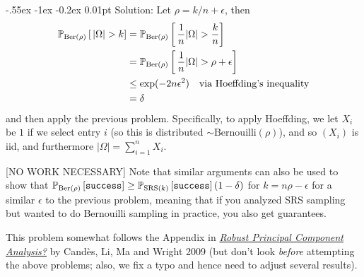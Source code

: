 \documentclass[10pt, letterpaper]{scrartcl}
\makeatletter
\newlength{\savedparindent}
\newcommand\solParagraph{\@startsection{paragraph}{4}{\z@}%
    {-.55ex \@plus -1ex \@minus -0.2ex}%
    {0.01pt}%
    {\raggedsection\normalfont\sectfont\nobreak\size@paragraph}%
}
\newenvironment{solution}{\setlength{\parindent}{\savedparindent}\solParagraph{Solution:}}{}
\makeatother
\begin{document}
\begin{enumerate}[align=left, leftmargin=*, label=\sffamily\bfseries Problem \arabic*:]
{\begin{enumerate}
\begin{solution}
Let $\rho = k/n + \epsilon$, then 
\begin{align*}
\probrho{\rho}{ \,|\Omega|>k } &= \probrho{\rho}{ \,\frac1n|\Omega|> \frac{k}{n} } \\
&= \probrho{\rho}{ \,\frac1n|\Omega|> \rho + \epsilon } \\
&\le \text{exp}( -2n\epsilon^2 ) \quad\text{via Hoeffding's inequality} \\
&= \delta
\end{align*}
and then apply the previous problem.  Specifically, to apply Hoeffding, we let $X_i$ be $1$ if we select entry $i$ (so this is distributed $\sim\text{Bernouilli}(\rho)$), and so $(X_i)$ is iid, and furthermore $|\Omega| = \sum_{i=1}^n X_i$.

\end{solution}



\end{enumerate}

\vspace{2ex}
[NO WORK NECESSARY] Note that similar arguments can also be used to show that $\operatorname{\mathbb{P}}_{\text{Ber}(\rho)}\left[\texttt{success}\right] \ge \operatorname{\mathbb{P}}_{\text{SRS}(k)}\left[\texttt{success}\right](1 - \delta)$ for $k = n\rho - \epsilon$ for a similar $\epsilon$ to the previous problem, meaning that if you analyzed SRS sampling but wanted to do Bernouilli sampling in practice, you also get guarantees.

This problem somewhat follows the Appendix in \href{http://arxiv.org/abs/0912.3599}{\emph{Robust Principal Component Analysis?}} by Cand\`es, Li, Ma and Wright 2009 (but don't look \emph{before} attempting the above problems; also, we fix a typo and hence need to adjust several results).

}


\end{enumerate}   
\end{document}
